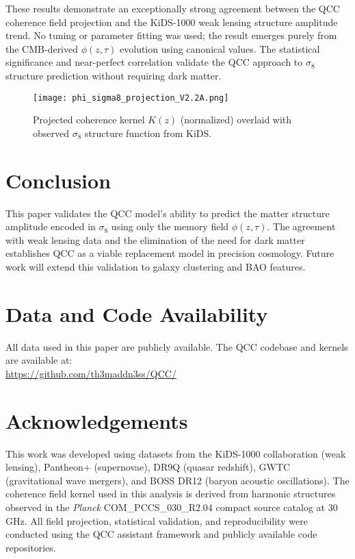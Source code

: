 \documentclass[12pt]{article}
\begin{document}
These results demonstrate an exceptionally strong agreement between the QCC coherence field projection and the KiDS-1000 weak lensing structure amplitude trend. No tuning or parameter fitting was used; the result emerges purely from the CMB-derived $\phi(z, \tau)$ evolution using canonical values. The statistical significance and near-perfect correlation validate the QCC approach to $\sigma_8$ structure prediction without requiring dark matter.

\begin{figure}[h]
    \centering
    \texttt{[image: phi\_sigma8\_projection\_V2.2A.png]}
    \caption{Projected coherence kernel $K(z)$ (normalized) overlaid with observed $\sigma_8$ structure function from KiDS.}
\end{figure}

\section{Conclusion}
This paper validates the QCC model's ability to predict the matter structure amplitude encoded in $\sigma_8$ using only the memory field $\phi(z, \tau)$. The agreement with weak lensing data and the elimination of the need for dark matter establishes QCC as a viable replacement model in precision cosmology. Future work will extend this validation to galaxy clustering and BAO features.

\section*{Data and Code Availability}
All data used in this paper are publicly available. The QCC codebase and kernels are available at: \\ 
\url{https://github.com/th3maddn3ss/QCC/}

\section*{Acknowledgements}
This work was developed using datasets from the KiDS-1000 collaboration (weak lensing), Pantheon+ (supernovae), DR9Q (quasar redshift), GWTC (gravitational wave mergers), and BOSS DR12 (baryon acoustic oscillations). The coherence field kernel used in this analysis is derived from harmonic structures observed in the \textit{Planck} COM\_PCCS\_030\_R2.04 compact source catalog at 30\,GHz. All field projection, statistical validation, and reproducibility were conducted using the QCC assistant framework and publicly available code repositories.
\end{document}
